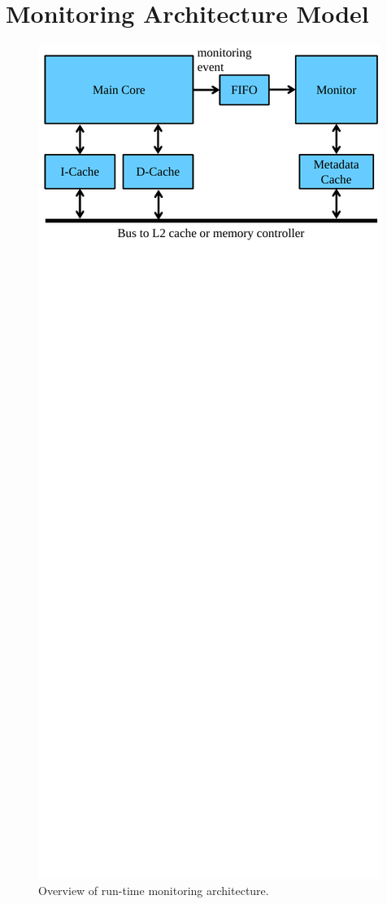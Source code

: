 \section{Monitoring Architecture Model}
\label{sec:arch}

\begin{figure}
  \begin{center}
    \includegraphics[width=\columnwidth]{figs/monitoring_architecture.pdf}
    \vspace{-0.2in}
    \caption{Overview of run-time monitoring architecture.}
    \label{fig:arch.overview} 
    \vspace{-0.2in}
  \end{center}
\end{figure}

